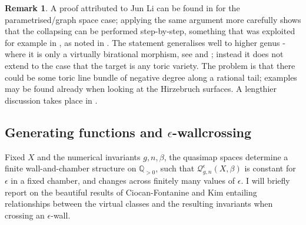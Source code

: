 \documentclass[11pt]{amsart}
\newcommand{\Qe}[4]{\mathcal{Q}^{\epsilon}_{#1,#2}(#3,#4)}
\newcommand{\QQ}{\mathbb{Q}}
\theoremstyle{definition}
\theoremstyle{definition}
\newtheorem{rmk}[thm]{Remark}
\begin{document}
\begin{rmk}
 A proof attributed to Jun Li can be found in \cite[Lemma 2.6]{LLY1} for the parametrised/graph space case; applying the same argument more carefully shows that the collapsing can be performed step-by-step, something that was exploited for example in \cite{Mustata}, as noted in \cite{CF-K-wallcrossing}. The statement generalises well to higher genus - where it is only a virtually birational morphism, see \cite[Theorem 3]{MOP} and \cite[Proposition 4.21]{Manolache-Push}; instead it does not extend to the case that the target is any toric variety. The problem is that there could be some toric line bundle of negative degree along a rational tail; examples may be found already when looking at the Hirzebruch surfaces. A lengthier discussion takes place in \cite[Appendix A]{BN}.
\end{rmk}

\subsection{Generating functions and $\epsilon$-wallcrossing} Fixed $X$ and the numerical invariants $g,n,\beta$, the quasimap spaces determine a finite wall-and-chamber structure on $\QQ_{>0}$, such that $\Qe{g}{n}{X}{\beta}$ is constant for $\epsilon$ in a fixed chamber, and changes across finitely many values of $\epsilon$. I will briefly report on the beautiful results of Ciocan-Fontanine and Kim \cite{CF-K-wallcrossing,CF-K-higher-genus,CF-K-MirrorSymmetry} entailing relationships between the virtual classes and the resulting invariants when crossing an $\epsilon$-wall.
\end{document}
